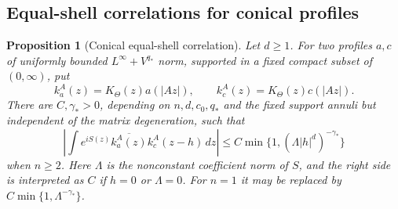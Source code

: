 \documentclass[11pt]{article}
\numberwithin{equation}{section}
\newtheorem{proposition}[theorem]{Proposition}
\theoremstyle{remark}
\theoremstyle{definition}
\begin{document}
\subsection{Equal-shell correlations for conical profiles}
\begin{proposition}[Conical equal-shell correlation]\label{mod:equal-correlation}
Let $d\ge1$. For two profiles $a,c$ of uniformly bounded $L^\infty+V^{q_*}$ norm, supported
in a fixed compact subset of $(0,\infty)$, put
\[
 k_a^A(z)=K_\Theta(z)a(|Az|),\qquad
 k_c^A(z)=K_\Theta(z)c(|Az|).
\]
There are $C,\gamma_*>0$, depending on $n,d,c_0,q_*$ and the fixed
support annuli but independent of the matrix degeneration, such that
\begin{equation}\label{mod:equal-correlation-eq}
 \left|\int e^{iS(z)}\overline{k_a^A(z)}k_c^A(z-h)\,dz\right|
 \le C\min\{1,(\Lambda|h|^d)^{-\gamma_*}\}
\end{equation}
when $n\ge2$. Here $\Lambda$ is the nonconstant coefficient norm of $S$,
and the right side is interpreted as $C$ if $h=0$ or $\Lambda=0$.
For $n=1$ it may be replaced by $C\min\{1,\Lambda^{-\gamma_*}\}$.
\end{proposition}
\end{document}
